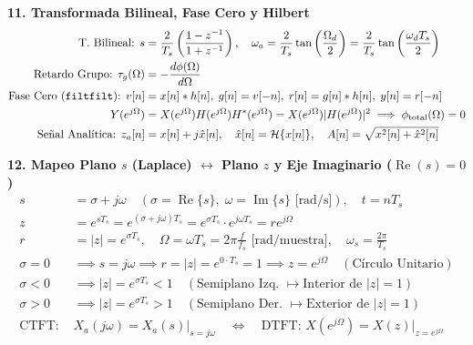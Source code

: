 \documentclass[10pt, a4paper, twocolumn]{article}
\begin{document}
\vspace{3pt}
\textbf{11. Transformada Bilineal, Fase Cero y Hilbert}
\begin{align*}
    \text{T. Bilineal: } s &= \frac{2}{T_s} \left(\frac{1 - z^{-1}}{1 + z^{-1}}\right), \quad \omega_a = \frac{2}{T_s} \tan\left(\frac{\Omega_d}{2}\right) = \frac{2}{T_s} \tan\left(\frac{\omega_d T_s}{2}\right) \\
    \text{Retardo Grupo: } \tau_g(\Omega) &= -\frac{d\phi(\Omega)}{d\Omega} \\
    \text{Fase Cero (\texttt{filtfilt}): } v[n] &= x[n]*h[n], \; g[n]=v[-n], \; r[n]=g[n]*h[n], \; y[n]=r[-n] \\
    Y(e^{j\Omega}) &= X(e^{j\Omega}) H(e^{j\Omega}) H^*(e^{j\Omega}) = X(e^{j\Omega}) |H(e^{j\Omega})|^2 \implies \phi_{\text{total}}(\Omega) = 0 \\
    \text{Señal Analítica: } z_a[n] &= x[n] + j\hat{x}[n], \quad \hat{x}[n] = \mathcal{H}\{x[n]\}, \quad A[n] = \sqrt{x^2[n] + \hat{x}^2[n]}
\end{align*}



\vspace{2pt}
\textbf{12. Mapeo Plano $s$ (Laplace) $\leftrightarrow$ Plano $z$ y Eje Imaginario ($\operatorname{Re}(s)=0$)}
\begin{align*}
    s &= \sigma + j\omega \quad (\sigma = \operatorname{Re}\{s\}, \; \omega = \operatorname{Im}\{s\} \text{ [rad/s]}), \quad t = n T_s \\
    z &= e^{s T_s} = e^{(\sigma + j\omega) T_s} = e^{\sigma T_s} \cdot e^{j\omega T_s} = r e^{j\Omega} \\
    r &= |z| = e^{\sigma T_s}, \quad \Omega = \omega T_s = 2\pi \frac{f}{f_s} \text{ [rad/muestra]}, \quad \omega_s = \frac{2\pi}{T_s} \\
    \sigma = 0 &\implies s = j\omega \implies r = |z| = e^{0 \cdot T_s} = 1 \implies z = e^{j\Omega} \quad (\text{Círculo Unitario}) \\
    \sigma < 0 &\implies |z| = e^{\sigma T_s} < 1 \quad (\text{Semiplano Izq. } \mapsto \text{Interior de } |z|=1) \\
    \sigma > 0 &\implies |z| = e^{\sigma T_s} > 1 \quad (\text{Semiplano Der. } \mapsto \text{Exterior de } |z|=1) \\
    \text{CTFT: } & X_a(j\omega) = X_a(s)\Big|_{s = j\omega} \quad \Longleftrightarrow \quad \text{DTFT: } X(e^{j\Omega}) = X(z)\Big|_{z = e^{j\Omega}}
\end{align*}
\end{document}
